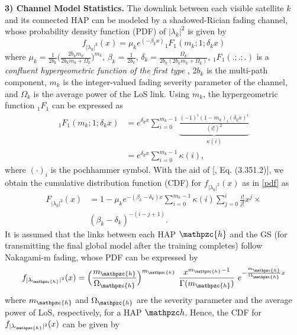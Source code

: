 \documentclass[letter,journal]{IEEEtran}
\begin{document}
{\bf 3) Channel Model Statistics.}
The downlink between each visible satellite $k$ and its connected HAP can be modeled by a shadowed-Rician fading channel, whose probability density function (PDF) of $|\lambda_{k}|^2$ is given by \cite{bankey2021physical} 
\begin{equation}\label{pdf}
    f_{|\lambda_{k}|^2}(x)=\mu_k e^{(-\beta_k x)}{_1 F_1}(m_k;1;\delta_k x)
\end{equation}
where $\mu_k=\frac{1}{2b_k}\big(\frac{2b_k  m_k}{2b_k  m_k+\Omega_k})^{m_k}$, $\beta_k=\frac{1}{2b_k}$, $\delta_k=\frac{\Omega_k}{2b_k(2b_k m_k+\Omega_k )}$, ${_1F_1(.;.;.)}$ is a {\em confluent hypergeometric function of the first type} \cite{VANASSCHE}, 2$b_k$ is the multi-path component, $m_k$ is the integer-valued fading severity parameter of the channel, and $\Omega_k$ is the average power of the LoS link. Using $m_k$, the hypergeometric function $_1F_1$ can be expressed as\vspace{-0.1cm}
\begin{align}
_1F_1(m_k;1;\delta_k x) &= e^{\delta_k x} \sum_{i=0}^{m_k-1} \underbrace{\frac{{(-1)}^i {(1-m_k)}_i {(\delta_k x)}^i}{{(i!)}^2}}_{\kappa(i)}
\nonumber\\&= e^{\delta_k x} \sum_{i=0}^{m_k-1} \kappa(i),
\end{align}
where $(\cdot)_i$ is the pochhammer symbol. With the aid of [, Eq. (3.351.2)], we obtain the  cumulative distribution function (CDF) for $f_{|\lambda_{k}|^2}(x)$ as in \eqref{pdf} as\vspace{-0.1cm}
\begin{align}\label{eqn_Fk}
F_{|\lambda_{k}|^2}(x) &= 1-\mu_k  e^{-(\beta_k-\delta_k)x} \sum_{i=0}^{m_k-1} \kappa(i)  \sum_{j=0}^i \frac{i!}{j!} x^j  \times \nonumber\\& (\beta_k-\delta_k )^{-(i-j+1)}.
\end{align}
It is assumed that the links between each HAP $\mathpzc{h}$ and the GS (for transmitting the final global model after the training completes) follow Nakagami-m fading, whose PDF can be expressed by \cite{gamal2022performance}\vspace{-0.1cm}
\begin{equation}
    f_{|\lambda_\mathpzc{h}|^2}(x)=\Big(\frac{m_\mathpzc{h}}{\Omega_\mathpzc{h}}\Big)^{m_\mathpzc{h}}~\frac{x^{m_\mathpzc{h}-1}}{\Gamma(m_\mathpzc{h})}~e^{-\frac{m_\mathpzc{h}}{\Omega_\mathpzc{h}}x}
\end{equation}
where $m_\mathpzc{h}$ and $\Omega_\mathpzc{h}$ are the severity parameter and the average power of LoS, respectively, for a HAP $\mathpzc h$. Hence, the CDF for $f_{|\lambda_\mathpzc{h}|^2}(x)$ can be given by\vspace{-0.2cm}
\end{document}

